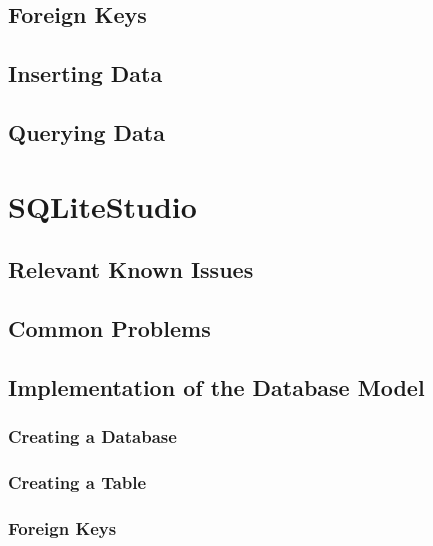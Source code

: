 \documentclass[a4paper,11pt,oneside]{article}
\begin{document}
\begin{sloppypar}
\subsection{Foreign Keys}
\label{dbeaverForeignKeys}

\subsection{Inserting Data}
\label{dbeaverInsertingData}

\subsection{Querying Data}
\label{dbeaverQueryingData}


\section{SQLiteStudio}
\label{sqliteStudio}

\subsection{Relevant Known Issues}
\label{sqliteStudioKnownIssues}

\subsection{Common Problems}
\label{sqliteStudioCommonProblems}

\subsection{Implementation of the Database Model}
\label{sqliteStudioImplementation}

\subsubsection{Creating a Database}
\label{sqliteStudioCreatingDatabase}

\subsubsection{Creating a Table}
\label{sqliteStudioCreatingTable}

\subsubsection{Foreign Keys}
\label{sqliteStudioForeignKeys}


\end{sloppypar}
\end{document}
